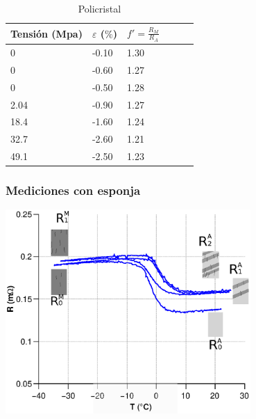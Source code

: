 \documentclass[usenames,dvipsnames]{beamer}
\begin{document}
\begin{frame}
\begin{multicols}{2}
 
\begin{table}
\tiny
\begin{center} 
\begin{tabular}{@{}llllll@{}} \toprule
Tensión (Mpa) & $\varepsilon$ ($\%$) &  $f'=\frac{R_M}{R_A}$\\ \midrule
 0        &  -0.10   & 1.30\\
 0       &  -0.60   & 1.27 \\
 0      &  -0.50   & 1.28 \\
 2.04      &  -0.90  & 1.27\\
 18.4    &  -1.60  & 1.24 \\
32.7      &  -2.60 & 1.21\\
 49.1     &  -2.50  & 1.23   \\
 \bottomrule
\end{tabular}
 \caption{Policristal}
\end{center}
\end{table}
 
\end{multicols}
 
 
\end{frame}


\begin{frame}

\frametitle{Mediciones con esponja}

\includegraphics[width=0.7\textwidth]{img/resistencia/Histeresis2.eps}

\end{frame}
\end{document}
